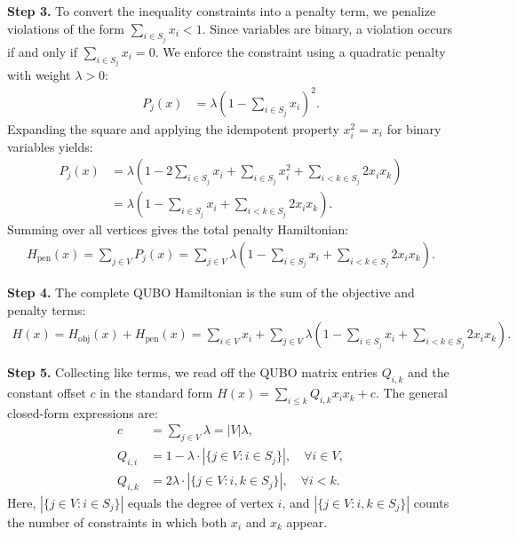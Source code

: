 \documentclass[12pt]{article}
\begin{document}
\textbf{Step 3.} To convert the inequality constraints into a penalty term, we penalize violations of the form $\sum_{i \in S_j} x_i < 1$. Since variables are binary, a violation occurs if and only if $\sum_{i \in S_j} x_i = 0$. We enforce the constraint using a quadratic penalty with weight $\lambda > 0$:
\begin{align}
    P_j(x) &= \lambda \left(1 - \sum_{i \in S_j} x_i\right)^2.
\end{align}
Expanding the square and applying the idempotent property $x_i^2 = x_i$ for binary variables yields:
\begin{align}
    P_j(x) &= \lambda \left(1 - 2\sum_{i \in S_j} x_i + \sum_{i \in S_j} x_i^2 + \sum_{i < k \in S_j} 2 x_i x_k\right) \\
    &= \lambda \left(1 - \sum_{i \in S_j} x_i + \sum_{i < k \in S_j} 2 x_i x_k\right).
\end{align}
Summing over all vertices gives the total penalty Hamiltonian:
\begin{align}
    H_{\text{pen}}(x) = \sum_{j \in V} P_j(x) = \sum_{j \in V} \lambda \left(1 - \sum_{i \in S_j} x_i + \sum_{i < k \in S_j} 2 x_i x_k\right).
\end{align}

\textbf{Step 4.} The complete QUBO Hamiltonian is the sum of the objective and penalty terms:
\begin{align}
    H(x) = H_{\text{obj}}(x) + H_{\text{pen}}(x) = \sum_{i \in V} x_i + \sum_{j \in V} \lambda \left(1 - \sum_{i \in S_j} x_i + \sum_{i < k \in S_j} 2 x_i x_k\right).
\end{align}

\textbf{Step 5.} Collecting like terms, we read off the QUBO matrix entries $Q_{i,k}$ and the constant offset $c$ in the standard form $H(x) = \sum_{i \le k} Q_{i,k} x_i x_k + c$. The general closed-form expressions are:
\begin{align}
    c &= \sum_{j \in V} \lambda = |V|\lambda, \\
    Q_{i,i} &= 1 - \lambda \cdot |\{j \in V : i \in S_j\}|, \quad \forall i \in V, \\
    Q_{i,k} &= 2\lambda \cdot |\{j \in V : i,k \in S_j\}|, \quad \forall i < k.
\end{align}
Here, $|\{j \in V : i \in S_j\}|$ equals the degree of vertex $i$, and $|\{j \in V : i,k \in S_j\}|$ counts the number of constraints in which both $x_i$ and $x_k$ appear.
\end{document}
